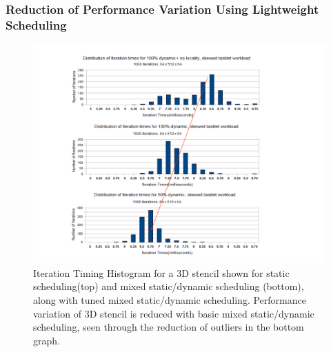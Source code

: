 {\begin{frame}
\frametitle{Reduction of Performance Variation Using Lightweight Scheduling}  
\begin{figure}     
\includegraphics[scale=0.35]{./plots/IterTimesHisto-sdImprovement.pdf} 
\caption{\small Iteration Timing Histogram for a 3D stencil shown for static scheduling(top) and mixed static/dynamic scheduling (bottom), along with tuned mixed static/dynamic scheduling. Performance variation of 3D stencil is reduced with basic mixed static/dynamic scheduling, seen through the reduction of outliers in the bottom graph.}      
\end{figure}
\end{frame}


}
